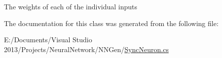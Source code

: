 The weights of each of the individual inputs 



The documentation for this class was generated from the following file\+:\begin{DoxyCompactItemize}
\item 
E\+:/\+Documents/\+Visual Studio 2013/\+Projects/\+Neural\+Network/\+N\+N\+Gen/\hyperlink{_sync_neuron_8cs}{Sync\+Neuron.\+cs}\end{DoxyCompactItemize}
